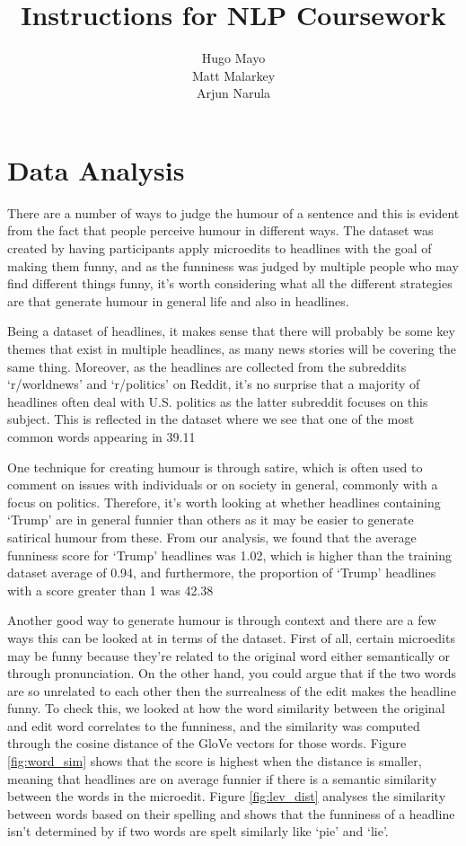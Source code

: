 \documentclass[11pt,a4paper]{article}
\title{Instructions for NLP Coursework}
\author{Hugo Mayo \\\And
  Matt Malarkey
  \\\And Arjun Narula\\}
\date{}
\begin{document}
\maketitle

\section{Data Analysis}

There are a number of ways to judge the humour of a sentence and this is evident from the fact that people perceive humour in different ways. The dataset was created by having participants apply microedits to headlines with the goal of making them funny, and as the funniness was judged by multiple people who may find different things funny, it’s worth considering what all the different strategies are that generate humour in general life and also in headlines. 

Being a dataset of headlines, it makes sense that there will probably be some key themes that exist in multiple headlines, as many news stories will be covering the same thing. Moreover, as the headlines are collected from the subreddits ‘r/worldnews’ and ‘r/politics’ on Reddit, it’s no surprise that a majority of headlines often deal with U.S. politics as the latter subreddit focuses on this subject. This is reflected in the dataset where we see that one of the most common words appearing in 39.11%

One technique for creating humour is through satire, which is often used to comment on issues with individuals or on society in general, commonly with a focus on politics. Therefore, it’s worth looking at whether headlines containing ‘Trump’ are in general funnier than others as it may be easier to generate satirical humour from these.  From our analysis, we found that the average funniness score for ‘Trump’ headlines was 1.02, which is higher than the training dataset average of 0.94, and furthermore, the proportion of ‘Trump’ headlines with a score greater than 1 was 42.38%

Another good way to generate humour is through context and there are a few ways this can be looked at in terms of the dataset. First of all, certain microedits may be funny because they’re related to the original word either semantically or through pronunciation. On the other hand, you could argue that if the two words are so unrelated to each other then the surrealness of the edit makes the headline funny. To check this, we looked at how the word similarity between the original and edit word correlates to the funniness, and the similarity was computed through the cosine distance of the GloVe vectors for those words. Figure \ref{fig:word_sim} shows that the score is highest when the distance is smaller, meaning that headlines are on average funnier if there is a semantic similarity between the words in the microedit. Figure \ref{fig:lev_dist} analyses the similarity between words based on their spelling and shows that the funniness of a headline isn’t determined by if two words are spelt similarly like ‘pie’ and ‘lie’. 
\end{document}
